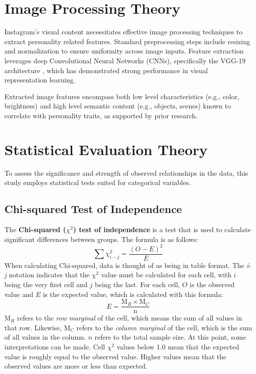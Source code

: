 \section{Image Processing Theory}

Instagram's visual content necessitates effective image processing techniques to extract personality related features. Standard preprocessing steps include resizing and normalization to ensure uniformity across image inputs. Feature extraction leverages deep Convolutional Neural Networks (CNNs), specifically the VGG-19 architecture \citep{simonyan2015}, which has demonstrated strong performance in visual representation learning.

Extracted image features encompass both low level characteristics (e.g., color, brightness) and high level semantic content (e.g., objects, scenes) known to correlate with personality traits, as supported by prior research.

\section{Statistical Evaluation Theory}
To assess the significance and strength of observed relationships in the data, this study employs statistical tests suited for categorical variables.

\subsection{Chi-squared Test of Independence}
The \textbf{Chi-squared ($\chi^2$) test of independence} is a test that is used to calculate significant differences between groups. The formula is as follows:
$$\sum\chi^2_{i-j} = \frac{(O - E)^2}{E}$$
When calculating Chi-squared, data is thought of as being in table format. The \textit{i-j} notation indicates that the $\chi^2$ value must be calculated for each cell, with $i$ being the very first cell and $j$ being the last. For each cell, $O$ is the observed value and $E$ is the expected value, which is calculated with this formula:
$$E = \frac{ \text{M}_R  \times  \text{M}_C }{\text{n}}$$
$\text{M}_R$ refers to the \textit{row marginal} of the cell, which means the sum of all values in that row. Likewise, $\text{M}_C$ refers to the \textit{column marginal} of the cell, which is the sum of all values in the column. $n$ refers to the total sample size. At this point, some interpretations can be made. Cell $\chi^2$ values below 1.0 mean that the expected value is roughly equal to the observed value. Higher values mean that the observed values are more or less than expected.

